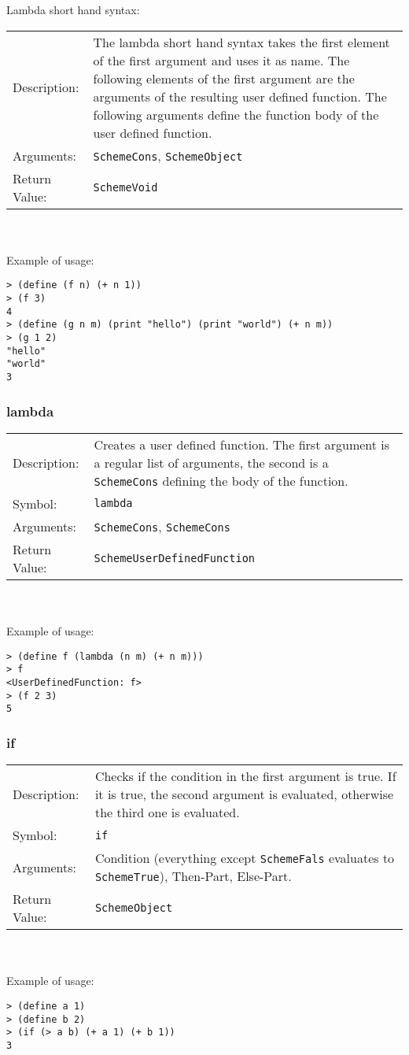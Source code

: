 \documentclass[12pt,a4paper]{scrartcl}
\begin{document}
Lambda short hand syntax:\\
\begin{tabular}{l  p{13cm}}
Description: & The lambda short hand syntax takes the first element of the first argument and uses it as name. The following elements of the first argument are the arguments of the resulting user defined function. The following arguments define the function body of the user defined function.\\
Arguments: & \lstinline{SchemeCons}, \lstinline{SchemeObject}\\
Return Value: & \lstinline{SchemeVoid}\\
\end{tabular}\\
\\
Example of usage:
\begin{lstlisting}
> (define (f n) (+ n 1))
> (f 3)
4
> (define (g n m) (print "hello") (print "world") (+ n m))
> (g 1 2)
"hello"
"world"
3
\end{lstlisting}

\subsubsection*{lambda}
\begin{tabular}{l  p{13cm}}
Description: & Creates a user defined function. The first argument is a regular list of arguments, the second is a \lstinline{SchemeCons} defining the body of the function.\\
Symbol: & \lstinline{lambda}\\
Arguments: & \lstinline{SchemeCons}, \lstinline{SchemeCons}\\
Return Value: & \lstinline{SchemeUserDefinedFunction}\\
\end{tabular}
\\
\\
Example of usage:
\begin{lstlisting}
> (define f (lambda (n m) (+ n m)))
> f
<UserDefinedFunction: f> 
> (f 2 3)
5
\end{lstlisting}


\subsubsection*{if}
\begin{tabular}{l  p{13cm}}
Description: & Checks if the condition in the first argument is true. If it is true, the second argument is evaluated, otherwise the third one is evaluated. \\
Symbol: & \lstinline{if}\\
Arguments: & Condition (everything except \lstinline{SchemeFals} evaluates to \lstinline{SchemeTrue}), Then-Part, Else-Part. \\
Return Value: & \lstinline{SchemeObject}\\
\end{tabular}
\\
\\
Example of usage:
\begin{lstlisting}
> (define a 1)
> (define b 2)
> (if (> a b) (+ a 1) (+ b 1))
3
\end{lstlisting}
\end{document}
